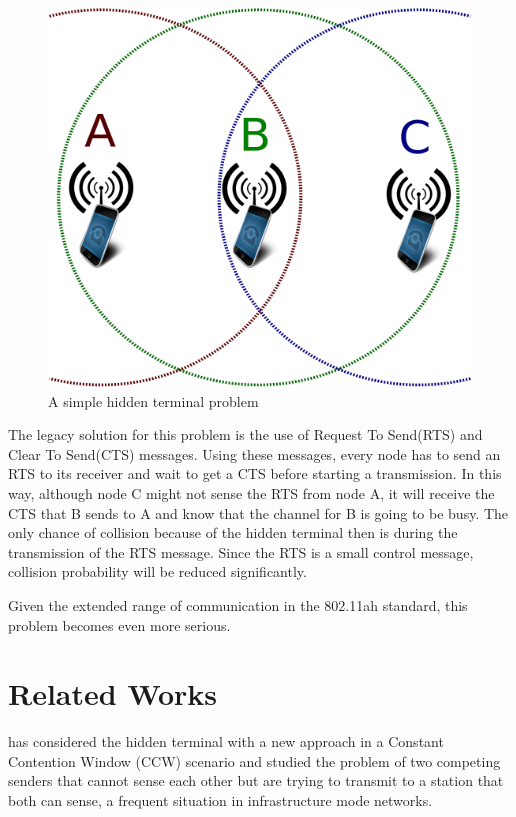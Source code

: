 \begin{figure} [!tbp]
  \centering
  \includegraphics[width=.95\textwidth]{figures/hidden}
  \caption{A simple hidden terminal problem}
  \label{fig:hidden}
\end{figure}

The legacy solution for this problem is the use of Request To Send(RTS) and Clear To Send(CTS) messages. Using these messages, every node has to send an RTS to its receiver and wait to get a CTS before starting a transmission. In this way, although node C might not sense the RTS from node A, it will receive the CTS that B sends to A and know that the channel for B is going to be busy. The only chance of collision because of the hidden terminal then is during the transmission of the RTS message. Since the RTS is a small control message, collision probability will be reduced significantly. 

Given the extended range of communication in the 802.11ah standard, this problem becomes even more serious.  

\section{Related Works}

\cite{tsertou2008revisiting} has considered the hidden terminal with a new approach in a Constant Contention Window (CCW) scenario and studied the problem of two competing senders that cannot sense each other but are trying to transmit to a station that both can sense, a frequent situation in infrastructure mode networks.

